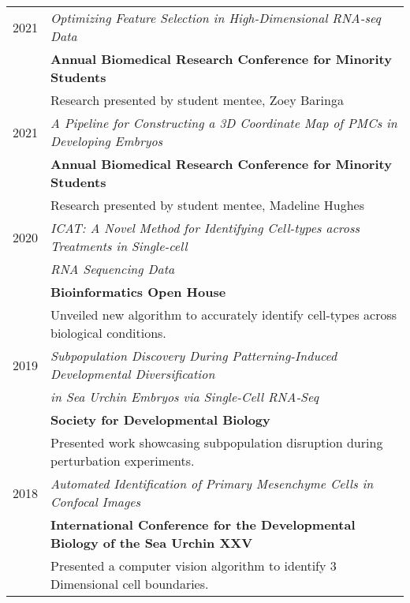 \documentclass[a4paper,10pt]{article}
\begin{document}
\section{\color{linkcolour}{Selected Posters and Presentations}}
\begin{longtable}{rl}
	\textsc{2021} & \emph{Optimizing Feature Selection in High-Dimensional RNA-seq Data}                 \\
	              & \textbf{Annual Biomedical Research Conference for Minority Students}                 \\
	              & \small{Research presented by student mentee, Zoey Baringa}                           \\
	\textsc{2021} & \emph{A Pipeline for Constructing a 3D Coordinate Map of PMCs in Developing Embryos} \\
	              & \textbf{Annual Biomedical Research Conference for Minority Students}                 \\
	              & \small{Research presented by student mentee, Madeline Hughes}                        \\
	\textsc{2020} & \emph{ICAT: A Novel Method for Identifying Cell-types across
	Treatments in Single-cell}                                                                           \\
	              & \emph{RNA Sequencing Data}                                                           \\
	              & \textbf{Bioinformatics Open House}                                                   \\
	              & \small{Unveiled new algorithm to accurately identify cell-types
	across biological conditions.}                                                                       \\
	\textsc{2019} & \emph{Subpopulation Discovery During Patterning-Induced
	Developmental Diversification}                                                                       \\
	              & \emph{in Sea Urchin Embryos via Single-Cell RNA-Seq}                                 \\
	              & \textbf{Society for Developmental Biology}                                           \\
	              & \small{Presented work showcasing subpopulation disruption
	during perturbation experiments.}                                                                    \\
	\textsc{2018} & \emph{Automated Identification of Primary Mesenchyme Cells
	in Confocal Images}                                                                                  \\
	              & \textbf{International Conference for the Developmental Biology of
	the Sea Urchin XXV}                                                                                  \\
	              & \small{Presented a computer vision algorithm to identify 3
	Dimensional cell boundaries.}                                                                        \\


\end{longtable}
\end{document}
